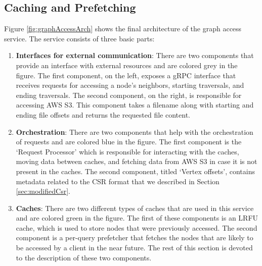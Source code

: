 \subsection{Caching and Prefetching}\label{sec:accessCachePrefetching}
Figure \ref{fig:graphAccessArch} shows the final architecture of the graph
access service. The service consists of three basic parts:
\begin{enumerate}
    \item \textbf{Interfaces for external communication}: There are two 
        components that provide an interface with external resources and are
        colored grey in the figure. The first component, on the left,
        exposes a gRPC interface that receives requests for accessing a node's
        neighbors, starting traversals, and ending traversals. The second
        component, on the right, is responsible for accessing AWS S3. This component
        takes a filename along with starting and ending file offsets and returns
        the requested file content.
    \item \textbf{Orchestration}: There are two components that help with
        the orchestration of requests and are colored blue in the figure. The first
        component is the `Request Processor' which is responsible for
        interacting with the caches, moving data between caches, and fetching
        data from AWS S3 in case it is not present in the caches. The second
        component, titled `Vertex offsets', contains metadata related to the CSR
        format that we described in Section \ref{sec:modifiedCsr}.
    \item \textbf{Caches}: There are two different types of caches that are used
        in this service and are colored green in the figure. The first of these
        components is an LRFU cache, which is used to store nodes that were
        previously accessed. The second component is a per-query prefetcher
        that fetches the nodes that are likely to be accessed by a client in
        the near future. The rest of this section is devoted to the description
        of these two components.
\end{enumerate}
